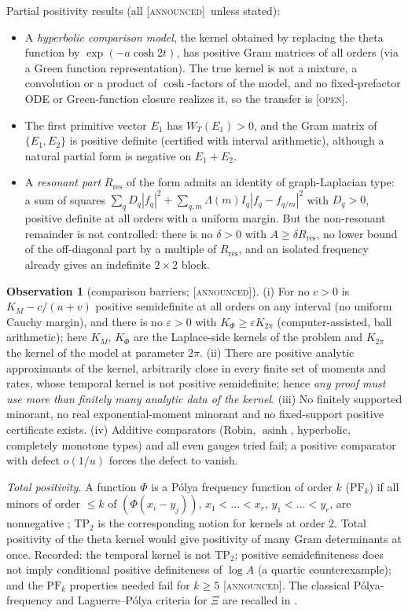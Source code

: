 \documentclass[11pt]{amsart}
\theoremstyle{definition}
\newtheorem{observation}[theorem]{Observation}
\theoremstyle{remark}
\numberwithin{equation}{section}
\newcommand{\WT}{W_T}                                  %
\newcommand{\stag}[1]{\textsc{[#1]}}
\newcommand{\OPENQ}{\stag{open}}
\newcommand{\ANNOUNCED}{\stag{announced}}
\begin{document}
Partial positivity results (all \ANNOUNCED\ unless stated):
\begin{itemize}
\item A \emph{hyperbolic comparison model}, the kernel obtained by replacing the theta function by
$\exp(-a\cosh2t)$, has positive Gram matrices of all orders (via a Green function representation). The true kernel is
not a mixture, a convolution or a product of $\cosh$-factors of the model, and no fixed-prefactor ODE or Green-function
closure realizes it, so the transfer is \OPENQ.
\item The first primitive vector $E_1$ has $\WT(E_1)>0$, and the Gram matrix of $\{E_1,E_2\}$ is positive definite
(certified with interval arithmetic), although a natural partial form is negative on $E_1+E_2$.
\item A \emph{resonant part} $R_{\mathrm{res}}$ of the form admits an identity of graph-Laplacian type: a sum of squares
$\sum_qD_q|f_q|^2+\sum_{q,m}\Lambda(m)I_q|f_q-f_{q/m}|^2$ with $D_q>0$, positive definite at all orders with a uniform
margin. But the non-resonant remainder is not controlled: there is no $\delta>0$ with $A\ge\delta R_{\mathrm{res}}$, no
lower bound of the off-diagonal part by a multiple of $R_{\mathrm{res}}$, and an isolated frequency already gives an
indefinite $2\times2$ block.
\end{itemize}

\begin{observation}[comparison barriers; \ANNOUNCED]\label{w5:obs:kernelbar}
(i) For no $c>0$ is $K_M-c/(u+v)$ positive semidefinite at all orders on any interval (no uniform Cauchy margin), and there
is no $\varepsilon>0$ with $K_\Phi\ge\varepsilon K_{2\pi}$ (computer-assisted, ball arithmetic); here $K_M$, $K_\Phi$ are the
Laplace-side kernels of the problem and $K_{2\pi}$ the kernel of the model at parameter $2\pi$. (ii) There are positive
analytic approximants of the kernel, arbitrarily close in every finite set of moments and rates, whose temporal kernel is
not positive semidefinite; hence \emph{any proof must use more than finitely many analytic data of the kernel}.
(iii) No finitely supported minorant, no real exponential-moment minorant and no fixed-support positive certificate
exists. (iv) Additive comparators (Robin, $\operatorname{asinh}$, hyperbolic, completely monotone types) and all even gauges
tried fail; a positive comparator with defect $o(1/u)$ forces the defect to vanish.
\end{observation}

\emph{Total positivity.} A function $\Phi$ is a Pólya frequency function of order $k$ ($\mathrm{PF}_k$) if all minors of
order $\le k$ of $(\Phi(x_i-y_j))$, $x_1<\dots<x_r$, $y_1<\dots<y_r$, are nonnegative \cite{Schoenberg1951}; $\mathrm{TP}_2$ is the
corresponding notion for kernels at order $2$. Total positivity of the theta kernel would give positivity of many Gram
determinants at once. Recorded: the temporal kernel is not $\mathrm{TP}_2$; positive semidefiniteness does not imply
conditional positive definiteness of $\log A$ (a quartic counterexample); and the $\mathrm{PF}_k$ properties needed fail for
$k\ge5$ \ANNOUNCED. The classical Pólya-frequency and Laguerre--Pólya criteria for $\Xi$ are recalled in \cite{P14}.
\end{document}
